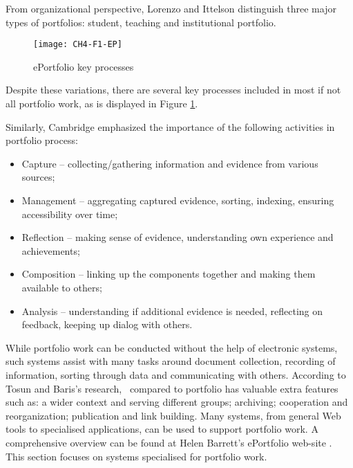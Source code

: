 From organizational perspective, Lorenzo and Ittelson \citeyearpar{Lorenzo2005}
distinguish three major types of portfolios: student, teaching and
institutional portfolio.

\begin{figure}[htb]
\centering
\texttt{[image: CH4-F1-EP]}
\caption[ePortfolio key processes]{ePortfolio key processes \citep{Malloff2010}}
\label{fig:ep}
\end{figure}

Despite these variations, there are several key processes included in most if
not all portfolio work, as is displayed in Figure \ref{fig:ep}.
 
Similarly, Cambridge \citeyearpar{Cambridge2010} emphasized the importance of
the following activities in portfolio process:

\begin{itemize}
  \item Capture -- collecting/gathering information and evidence from various
  sources;
  \item Management -- aggregating captured evidence, sorting, indexing, ensuring
  accessibility over time;
  \item Reflection -- making sense of evidence, understanding own experience and
  achievements;
  \item Composition -- linking up the components together and making them
  available to others;
  \item Analysis -- understanding if additional evidence is needed, reflecting
  on feedback, keeping up dialog with others.
\end{itemize}

While portfolio work can be conducted without the help of electronic systems,
such systems assist with many tasks around document collection, recording of
information, sorting through data and communicating with others. According
to Tosun and Baris's \citeyearpar{Tosun2011} research, \ep~compared to portfolio
has valuable extra features such as: a wider context and serving different
groups; archiving; cooperation and reorganization; publication and link building.
Many systems, from general Web tools to specialised applications, can be used to
support portfolio work. A comprehensive overview can be found at Helen Barrett's
ePortfolio web-site \citep{Barrett2008}. This section focuses on systems
specialised for portfolio work.

